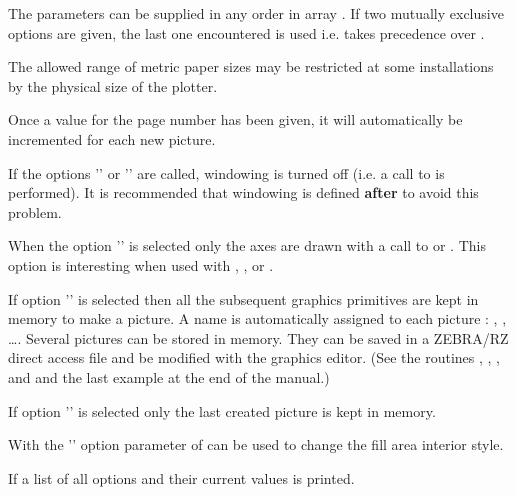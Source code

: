 \Remarks
\begin{UL}
\item The parameters can be supplied in any order in array . If two 
      mutually exclusive options are given, the last one encountered is used 
      i.e.  takes precedence over .
\item The allowed range of metric paper sizes may be restricted at some 
      installations by the physical size of the plotter.
\item Once a value for the page number has been given, it will automatically be 
      incremented for each new picture.
\item If the options '' or '' are called, windowing is turned
      off (i.e. a call to  is performed). It is recommended 
      that windowing is defined {\bf after }  to avoid this 
      problem.
\item When the option '' is selected only the axes are drawn with a 
      call to  or . This option is interesting when used
      with , ,  or .
\item If option '' is selected then all the subsequent graphics 
      primitives are kept in memory to make a \HIGZ{} picture. A name is 
      automatically assigned to each \HIGZ{} picture : , ,
      \ldots. Several pictures can be stored in memory. They can be saved in a 
      ZEBRA/RZ direct access file and be modified with the \HIGZ{} graphics 
      editor. (See the \HIGZ{} routines , , 
      ,  and  and the last example at the
      end of the manual.)
\item If option '' is selected only the last created picture is kept
      in memory.
\item With the '' option parameter  of  can 
      be used to change the fill area interior style.
\item If  a list of all options and their current values 
      is printed.
\end{UL}

\newpage

